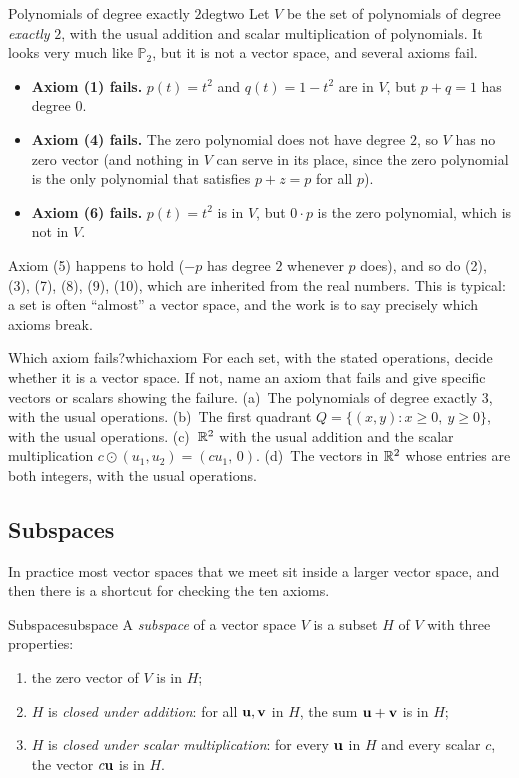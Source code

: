 \documentclass[11pt]{article}
\begin{document}
\begin{exmp}{Polynomials of degree exactly $2$}{degtwo}
Let $V$ be the set of polynomials of degree \emph{exactly} $2$, with the usual addition and scalar multiplication of polynomials. It looks very much like $\mathbb{P}_2$, but it is not a vector space, and several axioms fail.
\begin{itemize}
  \item \textbf{Axiom (1) fails.} $p(t)=t^2$ and $q(t)=1-t^2$ are in $V$, but $p+q=1$ has degree $0$.
  \item \textbf{Axiom (4) fails.} The zero polynomial does not have degree $2$, so $V$ has no zero vector (and nothing in $V$ can serve in its place, since the zero polynomial is the only polynomial that satisfies $p+z=p$ for all $p$).
  \item \textbf{Axiom (6) fails.} $p(t)=t^2$ is in $V$, but $0\cdot p$ is the zero polynomial, which is not in $V$.
\end{itemize}
Axiom (5) happens to hold ($-p$ has degree $2$ whenever $p$ does), and so do (2), (3), (7), (8), (9), (10), which are inherited from the real numbers. This is typical: a set is often ``almost'' a vector space, and the work is to say precisely which axioms break.
\end{exmp}

\begin{kc}{Which axiom fails?}{whichaxiom}
For each set, with the stated operations, decide whether it is a vector space. If not, name an axiom that fails and give specific vectors or scalars showing the failure. (a)~The polynomials of degree exactly $3$, with the usual operations. (b)~The first quadrant $Q=\{(x,y):x\geq0,\ y\geq0\}$, with the usual operations. (c)~$\mathbb{R}^2$ with the usual addition and the scalar multiplication $c\odot(u_1,u_2)=(cu_1,\,0)$. (d)~The vectors in $\mathbb{R}^2$ whose entries are both integers, with the usual operations.
\end{kc}

\subsection*{Subspaces}

In practice most vector spaces that we meet sit inside a larger vector space, and then there is a shortcut for checking the ten axioms.

\begin{defn}{Subspace}{subspace}
A \emph{subspace} of a vector space $V$ is a subset $H$ of $V$ with three properties:
\begin{enumerate}[label=(\alph*),itemsep=1pt]
  \item the zero vector of $V$ is in $H$;
  \item $H$ is \emph{closed under addition}: for all $\mathbf{u},\mathbf{v}$ in $H$, the sum $\mathbf{u}+\mathbf{v}$ is in $H$;
  \item $H$ is \emph{closed under scalar multiplication}: for every $\mathbf{u}$ in $H$ and every scalar $c$, the vector $c\mathbf{u}$ is in $H$.
\end{enumerate}
\end{defn}
\end{document}
